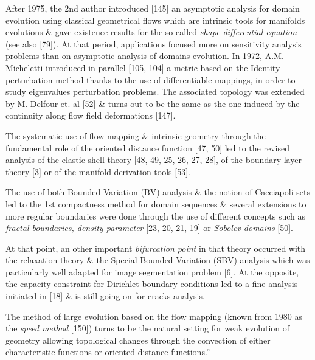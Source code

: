 \documentclass[oneside]{book}
\numberwithin{equation}{section}
\begin{document}
After 1975, the 2nd author introduced [145] an asymptotic analysis for domain evolution using classical geometrical flows which are intrinsic tools for manifolds evolutions \& gave existence results for the so-called \textit{shape differential equation} (see also [79]). At that period, applications focused more on sensitivity analysis problems than on asymptotic analysis of domains evolution. In 1972, A.M. Micheletti introduced in parallel [105, 104] a metric based on the Identity perturbation method thanks to the use of differentiable mappings, in order to study eigenvalues perturbation problems. The associated topology was extended by M. Delfour et. al [52] \& turns out to be the same as the one induced by the continuity along flow field deformations [147].

The systematic use of flow mapping \& intrinsic geometry through the fundamental role of the oriented distance function [47, 50] led to the revised analysis of the elastic shell theory [48, 49, 25, 26, 27, 28], of the boundary layer theory [3] or of the manifold derivation tools [53].

The use of both Bounded Variation (BV) analysis \& the notion of Cacciapoli sets led to the 1st compactness method for domain sequences \& several extensions to more regular boundaries were done through the use of different concepts such as \textit{fractal boundaries, density parameter} [23, 20, 21, 19] or \textit{Sobolev domains} [50].

At that point, an other important \textit{bifurcation point} in that theory occurred with the relaxation theory \& the Special Bounded Variation (SBV) analysis which was particularly well adapted for image segmentation problem [6]. At the opposite, the capacity constraint for Dirichlet boundary conditions led to a fine analysis initiated in [18] \& is still going on for cracks analysis.

The method of large evolution based on the flow mapping (known from 1980 as the \textit{speed method} [150]) turns to be the natural setting for weak evolution of geometry allowing topological changes through the convection of either characteristic functions or oriented distance functions.'' -- \cite[Chap. 1, pp. 1--3]{Moubachir_Zolesio2006}
\end{document}
